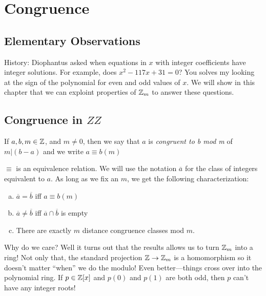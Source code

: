 \chapter{Congruence}\label{ch:Three}

\section{Elementary Observations}%
\label{sec:elob}

History: Diophantus asked when equations in \(x\) with integer coefficients have
integer solutions. For example, does \(x^2-117x+31=0\)? You solves my looking at
the sign of the polynomial for even and odd values of \(x\). We will show in
this chapter that we can exploint properties of  \(\mathbb{Z} _m\) to answer these
questions.

\section{Congruence in \(ZZ\)}%
\label{sec:cong}

\begin{definition}[Congruence]
  \label{def:cong}
  If \(a,b,m \in \mathbb{Z}\), and \(m\neq 0\), then we say that \(a\) is
  \emph{congruent to b mod m} of \(m|(b-a)\) and we write \(a \equiv b (m)\)
\end{definition}

\(\equiv\) is an equivalence relation. We will use the notation \(\overline{a}\)
for the class of integers equivalent to \(a\). As long as we fix an \(m\), we
get the following characterization:

\begin{prop}
\begin{enumerate}[(a)]
  \item \(\overline{a} = \overline{b} \) iff \(a \equiv b (m)\)
  \item \(\overline{a}\neq \overline{b}\) iff
        \(\overline{a} \cap \overline{b} \) is empty
  \item There are exactly \(m\) distance congruence classes mod \(m\).
\end{enumerate}
\end{prop}

Why do we care? Well it turns out that the results allows us to turn \(\mathbb{Z}_m\)
into a ring! Not only that, the standard projection \(\mathbb{Z} \to \mathbb{Z} _m\) is a
homomorphism so it doesn't matter ``when'' we do the modulo! Even
better---things cross over into the polynomial ring. If \(p \in \mathbb{Z} [x]\) and
\(p(0)\) and \(p(1)\) are both odd, then \(p\) can't have any integer roots!

